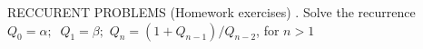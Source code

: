 \documentclass{amsart}
\begin{document}
RECCURENT PROBLEMS (Homework exercises)
\newline{}. Solve the recurrence 
$Q_{0} = \alpha; \;\; Q_{1}= \beta;$\newline 
\newline $Q_{n} = (1 + Q_{n-1}) / Q_{n-2}$, for $n > 1$
\end{document}
